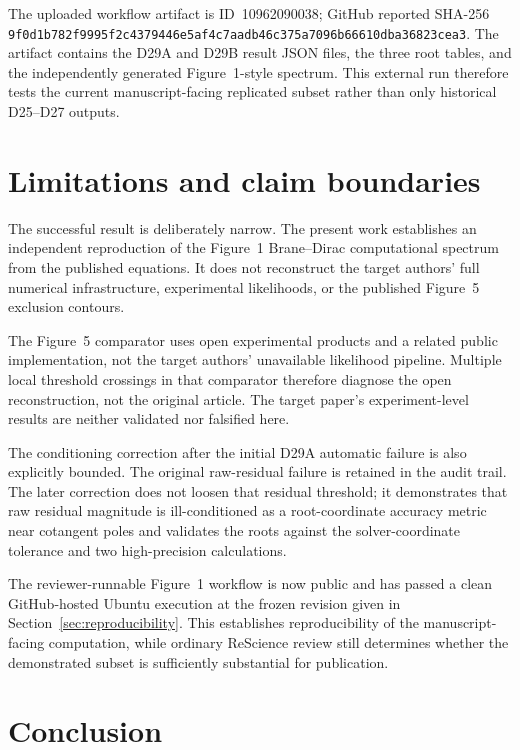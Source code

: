The uploaded workflow artifact is ID~10962090038; GitHub reported SHA-256
\texttt{9f0d1b782f9995f2c4379446e5af4c7aadb46c375a7096b66610dba36823cea3}. The artifact contains the D29A and D29B result JSON files, the three root tables, and the independently generated Figure~1-style spectrum. This external run therefore tests the current manuscript-facing replicated subset rather than only historical D25--D27 outputs.

\section{Limitations and claim boundaries}\label{sec:limitations}

The successful result is deliberately narrow. The present work establishes an independent reproduction of the Figure~1 Brane--Dirac computational spectrum from the published equations. It does not reconstruct the target authors' full numerical infrastructure, experimental likelihoods, or the published Figure~5 exclusion contours.

The Figure~5 comparator uses open experimental products and a related public implementation, not the target authors' unavailable likelihood pipeline. Multiple local threshold crossings in that comparator therefore diagnose the open reconstruction, not the original article. The target paper's experiment-level results are neither validated nor falsified here.

The conditioning correction after the initial D29A automatic failure is also explicitly bounded. The original raw-residual failure is retained in the audit trail. The later correction does not loosen that residual threshold; it demonstrates that raw residual magnitude is ill-conditioned as a root-coordinate accuracy metric near cotangent poles and validates the roots against the solver-coordinate tolerance and two high-precision calculations.

The reviewer-runnable Figure~1 workflow is now public and has passed a clean GitHub-hosted Ubuntu execution at the frozen revision given in Section~\ref{sec:reproducibility}. This establishes reproducibility of the manuscript-facing computation, while ordinary ReScience review still determines whether the demonstrated subset is sufficiently substantial for publication.

\section{Conclusion}\label{sec:conclusion}

